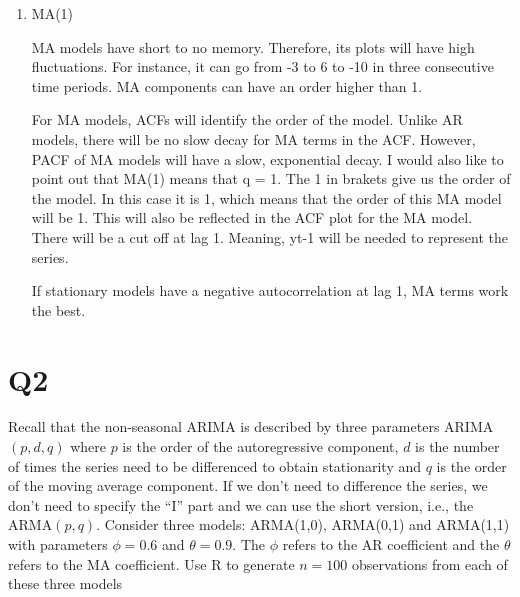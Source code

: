 \documentclass[
]{article}
\begin{document}
\begin{enumerate}[label=(\alph*)]
\item MA(1)

MA models have short to no memory. Therefore, its plots will have high fluctuations. For instance, it can go from -3 to 6 to -10 in three consecutive time periods. MA components can have an order higher than 1. 

For MA models, ACFs will identify the order of the model. Unlike AR models, there will be no slow decay for MA terms in the ACF. However, PACF of MA models will have a slow, exponential decay. I would also like to point out that MA(1) means that q = 1. The 1 in brakets give us the order of the model. In this case it is 1, which means that the order of this MA model will be 1. This will also be reflected in the ACF plot for the MA model. There will be a cut off at lag 1. Meaning, yt-1 will be needed to represent the series.

If stationary models have a negative autocorrelation at lag 1, MA terms work the best.

\end{enumerate}

\hypertarget{q2}{%
\section{Q2}\label{q2}}

\medskip

Recall that the non-seasonal ARIMA is described by three parameters
ARIMA\((p,d,q)\) where \(p\) is the order of the autoregressive
component, \(d\) is the number of times the series need to be
differenced to obtain stationarity and \(q\) is the order of the moving
average component. If we don't need to difference the series, we don't
need to specify the ``I'' part and we can use the short version, i.e.,
the ARMA\((p,q)\). Consider three models: ARMA(1,0), ARMA(0,1) and
ARMA(1,1) with parameters \(\phi=0.6\) and \(\theta= 0.9\). The \(\phi\)
refers to the AR coefficient and the \(\theta\) refers to the MA
coefficient. Use R to generate \(n=100\) observations from each of these
three models
\end{document}
